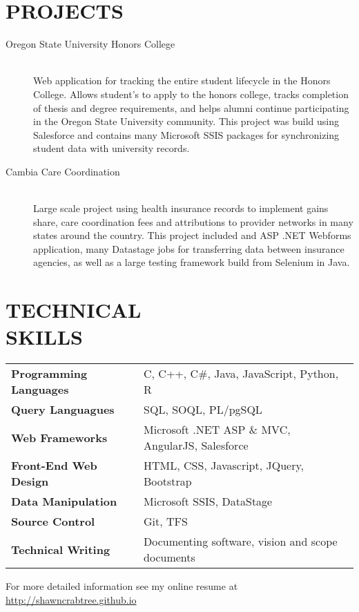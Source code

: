 \documentclass[margin]{res}
\newenvironment{bottompar}{\par\vspace*{\fill}}{\clearpage}
\begin{document}
\begin{resume}
 
\section{PROJECTS} 
                \begin{description}
                  \item[Oregon State University Honors College] \hfill \\
                  Web application for tracking the entire student lifecycle in the Honors College. Allows student's to apply to the honors college, tracks completion of thesis and degree requirements, and helps alumni continue participating in the  Oregon State University community. This project was build using Salesforce and contains many Microsoft SSIS packages for synchronizing student data with university records. 
                  \item[Cambia Care Coordination] \hfill \\
                  Large scale project using health insurance records to implement gains share, care coordination fees and attributions to provider networks in many states around the country. This project included and ASP .NET Webforms application, many Datastage jobs for transferring data between insurance agencies, as well as a large testing framework build from Selenium in Java. 
                \end{description}
             
\section{TECHNICAL \\ SKILLS} 

\begin{tabular}{ l l }
 \textbf{Programming Languages} & C, C++, C\#, Java, JavaScript, Python, R  \\
 \textbf{Query Languagues} & SQL, SOQL, PL/pgSQL   \\
 \textbf{Web Frameworks} & Microsoft .NET ASP \& MVC, AngularJS, Salesforce   \\
 \textbf{Front-End Web Design} & HTML, CSS, Javascript, JQuery, Bootstrap  \\
 \textbf{Data Manipulation} & Microsoft SSIS, DataStage  \\
 \textbf{Source Control} & Git, TFS \\   
 \textbf{Technical Writing} & Documenting software, vision and scope documents\\
\end{tabular}
\end{resume}

\begin{flushleft}
\begin{bottompar}
For more detailed information see my online resume at \href{http://shawncrabtree.github.io}{http://shawncrabtree.github.io}
\end{bottompar}
\end{flushleft}
\end{document}
